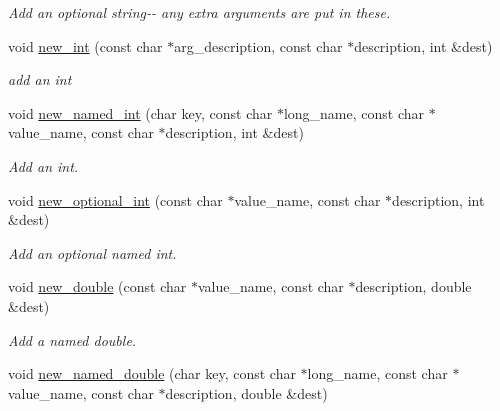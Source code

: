 \begin{DoxyCompactItemize}
\begin{DoxyCompactList}\small\item\em Add an optional string-\/-\/ any extra arguments are put in these. \end{DoxyCompactList}\item 
\hypertarget{classdsr_1_1_argument__helper_a635ea56e0a1584ad58769102fe6c42bc}{
void \hyperlink{classdsr_1_1_argument__helper_a635ea56e0a1584ad58769102fe6c42bc}{new\_\-int} (const char $\ast$arg\_\-description, const char $\ast$description, int \&dest)}
\label{classdsr_1_1_argument__helper_a635ea56e0a1584ad58769102fe6c42bc}

\begin{DoxyCompactList}\small\item\em add an int \end{DoxyCompactList}\item 
\hypertarget{classdsr_1_1_argument__helper_afacacc1b2b08c7af9636668ac21e84bb}{
void \hyperlink{classdsr_1_1_argument__helper_afacacc1b2b08c7af9636668ac21e84bb}{new\_\-named\_\-int} (char key, const char $\ast$long\_\-name, const char $\ast$value\_\-name, const char $\ast$description, int \&dest)}
\label{classdsr_1_1_argument__helper_afacacc1b2b08c7af9636668ac21e84bb}

\begin{DoxyCompactList}\small\item\em Add an int. \end{DoxyCompactList}\item 
\hypertarget{classdsr_1_1_argument__helper_a8b617d28ca592003f37709f7290775fa}{
void \hyperlink{classdsr_1_1_argument__helper_a8b617d28ca592003f37709f7290775fa}{new\_\-optional\_\-int} (const char $\ast$value\_\-name, const char $\ast$description, int \&dest)}
\label{classdsr_1_1_argument__helper_a8b617d28ca592003f37709f7290775fa}

\begin{DoxyCompactList}\small\item\em Add an optional named int. \end{DoxyCompactList}\item 
\hypertarget{classdsr_1_1_argument__helper_a0cc44a093a0478c44c7f0a03596e5d6e}{
void \hyperlink{classdsr_1_1_argument__helper_a0cc44a093a0478c44c7f0a03596e5d6e}{new\_\-double} (const char $\ast$value\_\-name, const char $\ast$description, double \&dest)}
\label{classdsr_1_1_argument__helper_a0cc44a093a0478c44c7f0a03596e5d6e}

\begin{DoxyCompactList}\small\item\em Add a named double. \end{DoxyCompactList}\item 
\hypertarget{classdsr_1_1_argument__helper_a9a09656821d3bf459eae3b08975dd3d4}{
void \hyperlink{classdsr_1_1_argument__helper_a9a09656821d3bf459eae3b08975dd3d4}{new\_\-named\_\-double} (char key, const char $\ast$long\_\-name, const char $\ast$value\_\-name, const char $\ast$description, double \&dest)}
\label{classdsr_1_1_argument__helper_a9a09656821d3bf459eae3b08975dd3d4}


\end{DoxyCompactItemize}
